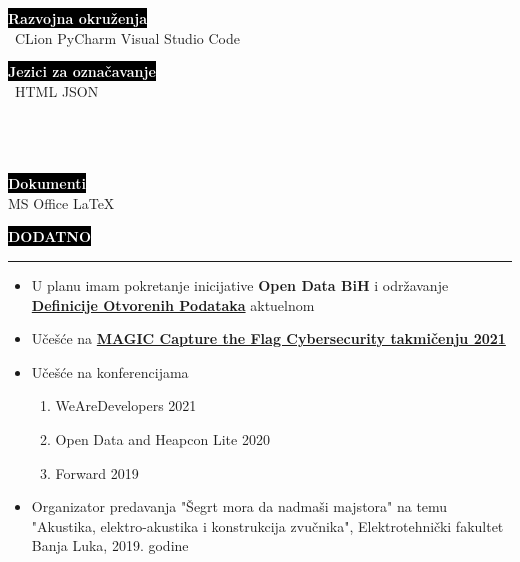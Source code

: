 \documentclass[9pt]{developercv} %
\begin{document}
\begin{minipage}[t]{0.4\textwidth}
	\vspace{-\baselineskip}
	
	\colorbox{black}{{\textcolor{white}{\textbf{Razvojna okruženja}}}}\smallskip\\\
	{CLion} \hspace{10} {PyCharm} \hspace{10} {Visual Studio Code}\smallskip\\
\end{minipage}
\hfill
\begin{minipage}[t]{0.3\textwidth}
	\vspace{-\baselineskip}
	
	\colorbox{black}{{\textcolor{white}{\textbf{Jezici za označavanje}}}}\smallskip\\\
	{HTML} \hspace{10} {JSON}\smallskip\\\\\\\
\end{minipage}
\hfill
\begin{minipage}[t]{0.2\textwidth}
	\vspace{-\baselineskip}
	
	\colorbox{black}{{\textcolor{white}{\textbf{Dokumenti}}}}\smallskip\\
	{MS Office} \hspace{10} {LaTeX}
\end{minipage}


\colorbox{black}{{\textcolor{white}{\textbf{\MakeUppercase{Dodatno}}}}}
\par\noindent\rule{\textwidth}{2px}
    \begin{itemize}
        \item U planu imam pokretanje inicijative {\textbf{Open Data BiH}} i održavanje {\href{https://opendefinition.org/od/2.1/bs/}{{\textbf{Definicije Otvorenih Podataka}}}} aktuelnom
        \item Učešće na {\textbf{\href{https://magicinc.org/programs/cybersecurity/capture-the-flag}{MAGIC Capture the Flag Cybersecurity takmičenju 2021}}}
        \item Učešće na konferencijama
        \begin{enumerate}
            \item WeAreDevelopers 2021
            \item Open Data and Heapcon Lite 2020
            \item Forward 2019
        \end{enumerate}
        \item Organizator predavanja "Šegrt mora da nadmaši majstora" na temu "Akustika, elektro-akustika i konstrukcija zvučnika", Elektrotehnički fakultet Banja Luka, 2019. godine
    \end{itemize}
\end{document}
